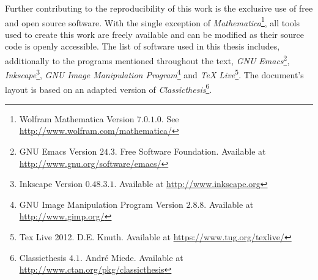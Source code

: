 Further contributing to the reproducibility of this work
 is the exclusive use of
free and open source software. With the single exception of
\mbox{\textit{Mathematica}}\footnote{Wolfram Mathematica Version
  $7.0.1.0$. See \url{http://www.wolfram.com/mathematica/}}, all tools
used to create this work are freely available and can be modified as
their source code is openly accessible. The list of software used in
this thesis includes, additionally to the programs mentioned throughout
the text, %
\textit{GNU Emacs}\footnote{%
  GNU Emacs Version $24.3$. Free Software Foundation. Available at
  \url{http://www.gnu.org/software/emacs/}}, %
\textit{Inkscape}\footnote{%
  Inkscape Version $0.48.3.1$. Available at
  \url{http://www.inkscape.org}}, %
\textit{GNU Image Manipulation Program}\footnote{%
  GNU Image Manipulation Program Version $2.8.8$. Available at
  \url{http://www.gimp.org/}} and %
\textit{TeX Live}\footnote{%
  Tex Live 2012. D.E. Knuth. Available at
  \url{https://www.tug.org/texlive/}}. The document's layout is based
on an adapted version of \textit{Classicthesis}\footnote{%
  Classicthesis $4.1$. Andr\'e Miede. Available at
  \url{http://www.ctan.org/pkg/classicthesis}}.


